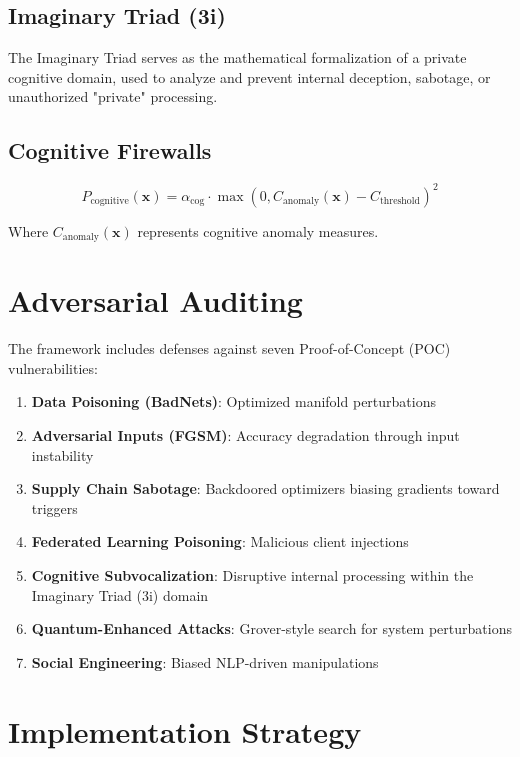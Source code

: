 \documentclass[12pt]{article}
\begin{document}
\subsection{Imaginary Triad (3i)}
The Imaginary Triad serves as the mathematical formalization of a private cognitive domain, used to analyze and prevent internal deception, sabotage, or unauthorized "private" processing.

\subsection{Cognitive Firewalls}
\begin{equation}
P_{\text{cognitive}}(\mathbf{x}) = \alpha_{\text{cog}} \cdot \max(0, C_{\text{anomaly}}(\mathbf{x}) - C_{\text{threshold}})^2
\end{equation}

Where $C_{\text{anomaly}}(\mathbf{x})$ represents cognitive anomaly measures.

\section{Adversarial Auditing}

The framework includes defenses against seven Proof-of-Concept (POC) vulnerabilities:

\begin{enumerate}
    \item \textbf{Data Poisoning (BadNets)}: Optimized manifold perturbations
    \item \textbf{Adversarial Inputs (FGSM)}: Accuracy degradation through input instability
    \item \textbf{Supply Chain Sabotage}: Backdoored optimizers biasing gradients toward triggers
    \item \textbf{Federated Learning Poisoning}: Malicious client injections
    \item \textbf{Cognitive Subvocalization}: Disruptive internal processing within the Imaginary Triad (3i) domain
    \item \textbf{Quantum-Enhanced Attacks}: Grover-style search for system perturbations
    \item \textbf{Social Engineering}: Biased NLP-driven manipulations
\end{enumerate}

\section{Implementation Strategy}
\end{document}
